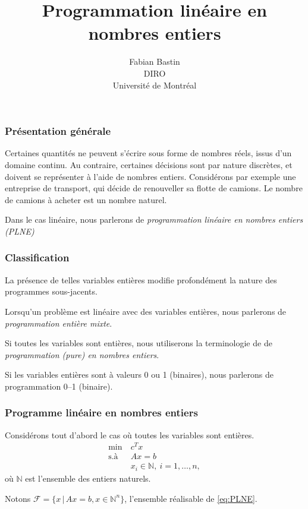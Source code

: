 \documentclass[usepdftitle=false]{beamer}
\title[PLNE]{Programmation linéaire en nombres entiers}
\author[Fabian Bastin]{Fabian Bastin\\DIRO\\Université de Montréal\\\mbox{}}
\date{}
\def\cF{\mathcal{F}}
\begin{document}
\frame{\titlepage}

\begin{frame}
\frametitle{Présentation générale}

Certaines quantités ne peuvent s'écrire sous forme de nombres réels, issus d'un domaine continu. Au contraire, certaines décisions sont par nature discrètes, et doivent se représenter à l'aide de nombres entiers.
Considérons par exemple une entreprise de transport, qui décide de renouveller sa flotte de camions.
Le nombre de camions à acheter est un nombre naturel.

\mbox{}

Dans le cas linéaire, nous parlerons de {\em programmation linéaire en nombres entiers (PLNE)}



\end{frame}

\begin{frame}
\frametitle{Classification}

La présence de telles variables entières modifie profondément la nature des programmes sous-jacents.

\mbox{}

Lorsqu'un problème est linéaire avec des variables entières, nous parlerons de {\sl programmation entière mixte}.

\mbox{}

Si toutes les variables sont entières, nous utiliserons la terminologie de de {\sl programmation (pure) en nombres entiers}.

\mbox{}

Si les variables entières sont à valeurs 0 ou 1 (binaires), nous parlerons de programmation 0--1 (binaire).

\end{frame}

\begin{frame}
\frametitle{Programme linéaire en nombres entiers}

Considérons tout d'abord le cas où toutes les variables sont entières.
\begin{equation}
\begin{aligned}
\min\ & c^Tx \\
\mbox{s.à } & Ax = b \\
& x_i \in \mathbb{N},\ i = 1,\ldots,n,
\end{aligned}
\tag{P}
\label{eq:PLNE}
\end{equation}
où $\mathbb{N}$ est l'ensemble des entiers naturels.

\mbox{}

Notons $\cF = \{ x \,|\, Ax = b, x \in \mathbb{N}^n \}$,
l'ensemble réalisable de \eqref{eq:PLNE}.

\end{frame}
\end{document}
